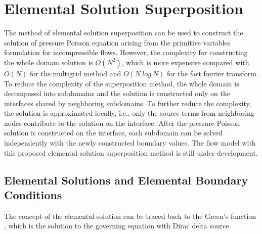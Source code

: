 \normalsize
\chapter{Elemental Solution Superposition}

The method of elemental solution superposition can be used to construct the solution of pressure Poisson equation arising from the primitive variables formulation for incompressible flows. However, the complexity for constructing the whole domain solution is $O(N^2)$, which is more expensive compared with $O(N)$ for the multigrid method and $O(N\ log \ N)$ for the fast fourier transform. To reduce the complexity of the superposition method, the whole domain is decomposed into subdomains and the solution is constructed only on the interfaces shared by neighboring subdomains. To further reduce the complexity, the solution is approximated locally, i.e., only the source terms from neighboring nodes contribute to the solution on the interface. After the pressure Poisson solution is constructed on the interface, each subdomain can be solved independently with the newly constructed boundary values. The flow model with this proposed elemental solution superposition method is still under development.



\section{Elemental Solutions and Elemental Boundary Conditions} \label{section-ESS}
The concept of the elemental solution can be traced back to the Green's function \cite{Green1828,Cheng05}, which is the solution to the governing equation with Dirac delta source.

